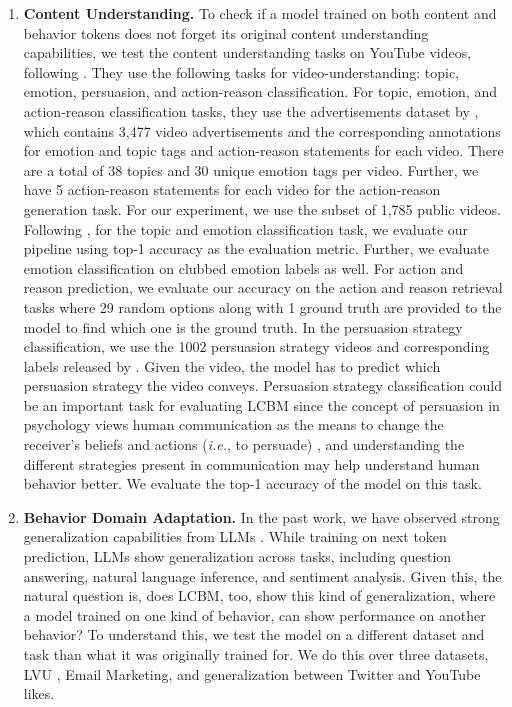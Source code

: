 \begin{enumerate}[leftmargin=*]
    \item\textbf{Content Understanding.} To check if a model trained on both content and behavior tokens does not forget its original content understanding capabilities, we test the content understanding tasks on YouTube videos, following \citet{bhattacharya2023video}. They use the following tasks for video-understanding: topic, emotion, persuasion, and action-reason classification. For topic, emotion, and action-reason classification tasks, they use the advertisements dataset by \citet{hussain2017automatic}, which contains 3,477 video advertisements and the corresponding annotations for emotion and topic tags and action-reason statements for each video. There are a total of 38 topics and 30 unique emotion tags per video. Further, we have 5 action-reason statements for each video for the action-reason generation task. For our experiment, we use the subset of 1,785 public videos.  Following \citet{bhattacharya2023video}, for the topic and emotion classification task, we evaluate our pipeline using top-1 accuracy as the evaluation metric. Further, we evaluate emotion classification on clubbed emotion labels as well. For action and reason prediction, we evaluate our accuracy on the action and reason retrieval tasks where 29 random options along with 1 ground truth are provided to the model to find which one is the ground truth.
    In the persuasion strategy classification, we use the 1002 persuasion strategy videos and corresponding labels released by \citet{bhattacharya2023video}. Given the video, the model has to predict which persuasion strategy the video conveys. Persuasion strategy classification could be an important task for evaluating LCBM since the concept of persuasion in psychology views human communication as the means to change the receiver's beliefs and actions (\textit{i.e.}, to persuade) \citep{kumar2023persuasion}, and understanding the different strategies present in communication may help understand human behavior better. We evaluate the top-1 accuracy of the model on this task.
    
    \item\textbf{Behavior Domain Adaptation.} In the past work, we have observed strong generalization capabilities from LLMs \citep{openai2023gpt4,ouyang2022training,raffel2020exploring}. While training on next token prediction, LLMs show generalization across tasks, including question answering, natural language inference, and sentiment analysis. Given this, the natural question is, does LCBM, too, show this kind of generalization, where a model trained on one kind of behavior, can show performance on another behavior? To understand this, we test the model on a different dataset and task than what it was originally trained for. We do this over three datasets, LVU \citep{wu2021towards}, \companyName Email Marketing\footnotemark[6], and generalization between Twitter and YouTube likes.
    

\end{enumerate}
